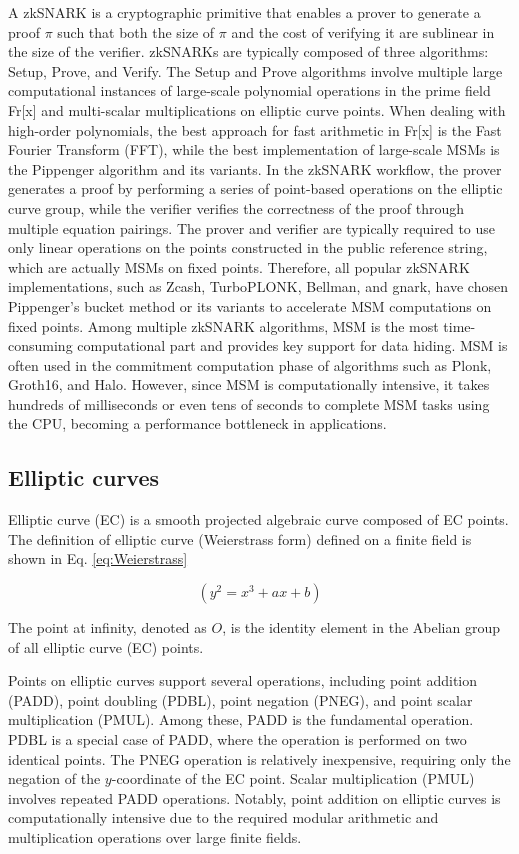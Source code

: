 \documentclass[journal=tches,final]{iacrtrans}
\begin{document}
A zkSNARK is a cryptographic primitive that enables a prover to generate a proof $\pi$ such that both the size of $\pi$ and the cost of verifying it are sublinear in the size of the verifier. zkSNARKs are typically composed of three algorithms: Setup, Prove, and Verify. The Setup and Prove algorithms involve multiple large computational instances of large-scale polynomial operations in the prime field Fr[x] and multi-scalar multiplications on elliptic curve points. When dealing with high-order polynomials, the best approach for fast arithmetic in Fr[x] is the Fast Fourier Transform (FFT), while the best implementation of large-scale MSMs is the Pippenger algorithm and its variants. In the zkSNARK workflow, the prover generates a proof by performing a series of point-based operations on the elliptic curve group, while the verifier verifies the correctness of the proof through multiple equation pairings. The prover and verifier are typically required to use only linear operations on the points constructed in the public reference string, which are actually MSMs on fixed points. Therefore, all popular zkSNARK implementations, such as Zcash, TurboPLONK, Bellman, and gnark, have chosen Pippenger's bucket method or its variants to accelerate MSM computations on fixed points. Among multiple zkSNARK algorithms, MSM is the most time-consuming computational part and provides key support for data hiding. MSM is often used in the commitment computation phase of algorithms such as Plonk, Groth16, and Halo. However, since MSM is computationally intensive, it takes hundreds of milliseconds or even tens of seconds to complete MSM tasks using the CPU, becoming a performance bottleneck in applications.

\subsection{Elliptic curves}
Elliptic curve (EC) is a smooth projected algebraic curve composed of EC points. The definition of elliptic curve (Weierstrass form) defined on a finite field is shown in Eq. \eqref{eq:Weierstrass}

\begin{equation}
(y^2=x^3+ax+b)
\label{eq:Weierstrass}
\end{equation}

The point at infinity, denoted as \( O \), is the identity element in the Abelian group of all elliptic curve (EC) points.

Points on elliptic curves support several operations, including point addition (PADD), point doubling (PDBL), point negation (PNEG), and point scalar multiplication (PMUL). Among these, PADD is the fundamental operation. PDBL is a special case of PADD, where the operation is performed on two identical points. The PNEG operation is relatively inexpensive, requiring only the negation of the \( y \)-coordinate of the EC point. Scalar multiplication (PMUL) involves repeated PADD operations. Notably, point addition on elliptic curves is computationally intensive due to the required modular arithmetic and multiplication operations over large finite fields.
\end{document}
